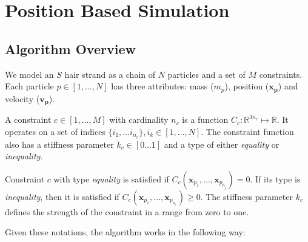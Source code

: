 \documentclass[sigplan,screen,nonacm]{acmart}
\begin{document}
\section{Position Based Simulation}

\subsection{Algorithm Overview}
\label{section:algorithmOverview}
We model an $S$ hair strand as a chain of $N$ particles and a set of $M$
constraints. Each particle $p \in [1,\ldots,N]$ has three attributes: mass ($m_p$), position
($\boldsymbol{x_p}$) and velocity ($\boldsymbol{v_p}$). 

A constraint $c \in [1,\ldots,M]$ with cardinality $n_c$ is a function $C_c
: \mathbb{R} ^{3n_c} \mapsto \mathbb{R}$. It operates on a set of indices $\{i_1,\ldots
i_{n_c}\}, i_k \in [1,...,N]$. The constraint function also has a stiffness
parameter $k_c \in [0...1]$ and a type of either \emph{equality} or
\emph{inequality}.

Constraint $c$ with type \emph{equality} is satisfied if
$C_c(\boldsymbol{x}_{p_1},\ldots, \boldsymbol{x}_{p_{n_j}})=0$. If its type is
\emph{inequality}, then it is satisfied if $C_c(\boldsymbol{x}_{p_1}, \ldots,
\boldsymbol{x}_{p_{n_c}}) \geq 0$. The stiffness parameter $k_c$ defines the
strength of the constraint in a range from zero to one.

Given these notations, the algorithm works in the following way:
\end{document}
